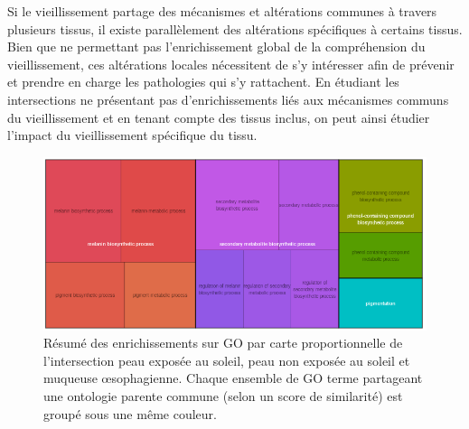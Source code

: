 Si le vieillissement partage des mécanismes et altérations communes à travers plusieurs tissus, il existe parallèlement des altérations spécifiques à certains tissus. Bien que ne permettant pas l'enrichissement global de la compréhension du vieillissement, ces altérations locales nécessitent de s'y intéresser afin de prévenir et prendre en charge les pathologies qui s'y rattachent. En étudiant les intersections ne présentant pas d'enrichissements liés aux mécanismes communs du vieillissement et en tenant compte des tissus inclus, on peut ainsi étudier l'impact du vieillissement spécifique du tissu.

\begin{figure}[hb]
    \centering
    \includegraphics[width=1\textwidth]{img/chap2/chap2_revigo_resume_enrich_skin.png}
    \caption{Résumé des enrichissements sur GO par carte proportionnelle de l'intersection peau exposée au soleil, peau non exposée au soleil et muqueuse œsophagienne. Chaque ensemble de GO terme partageant une ontologie parente commune (selon un score de similarité) est groupé sous une même couleur.}
    \label{figure:revigo_resume_melanine}
\end{figure}


